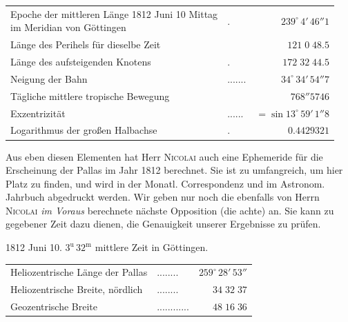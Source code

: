 \begin{center}\fontsize{10}{12}\selectfont\setlength{\tabcolsep}{4pt}\renewcommand{\arraystretch}{1.15}\begin{tabular}{llr}
\shortstack[l]{Epoche der mittleren Länge 1812 Juni 10 Mittag\\im Meridian von Göttingen} & . & $239^\circ\,4'\,46''1$\\
Länge des Perihels für dieselbe Zeit &  & $121\;0\;48.5$\\
Länge des aufsteigenden Knotens & . & $172\;32\;44.5$\\
Neigung der Bahn & .\;.\;.\;.\;.\;.\;. & $34^\circ\,34'\,54''7$\\
Tägliche mittlere tropische Bewegung &  & $768''5746$\\
Exzentrizität & .\;.\;.\;.\;.\;. & $=\sin13^\circ\,59'\,1''8$\\
Logarithmus der großen Halbachse & . & $0.4429321$\\
\end{tabular}\end{center}

\par\indent Aus eben diesen Elementen hat Herr \textsc{Nicolai} auch eine Ephemeride für die Erscheinung der Pallas im Jahr 1812 berechnet. Sie ist zu umfangreich, um hier Platz zu finden, und wird in der Monatl. Correspondenz und im Astronom. Jahrbuch abgedruckt werden. Wir geben nur noch die ebenfalls von Herrn \textsc{Nicolai} \emph{im Voraus} berechnete nächste Opposition (die achte) an. Sie kann zu gegebener Zeit dazu dienen, die Genauigkeit unserer Ergebnisse zu prüfen.
\begin{center}1812 Juni 10. $3^{\mathrm u}\,32^{\mathrm m}$ mittlere Zeit in Göttingen.\end{center}

\begin{center}\fontsize{10}{12}\selectfont\setlength{\tabcolsep}{4pt}\renewcommand{\arraystretch}{1.15}\begin{tabular}{llr}
Heliozentrische Länge der Pallas & .\;.\;.\;.\;.\;.\;.\;. & $259^\circ\,28'\,53''$\\
Heliozentrische Breite, nördlich & .\;.\;.\;.\;.\;.\;.\;. & $34\;32\;37$\\
Geozentrische Breite & .\;.\;.\;.\;.\;.\;.\;.\;.\;.\;.\;. & $48\;16\;36$\\
\end{tabular}\end{center}

